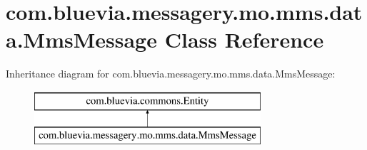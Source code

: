 \hypertarget{classcom_1_1bluevia_1_1messagery_1_1mo_1_1mms_1_1data_1_1MmsMessage}{
\section{com.bluevia.messagery.mo.mms.data.MmsMessage Class Reference}
\label{classcom_1_1bluevia_1_1messagery_1_1mo_1_1mms_1_1data_1_1MmsMessage}
}
Inheritance diagram for com.bluevia.messagery.mo.mms.data.MmsMessage:\begin{figure}[H]
\begin{center}
\leavevmode
\includegraphics[height=2.000000cm]{classcom_1_1bluevia_1_1messagery_1_1mo_1_1mms_1_1data_1_1MmsMessage}
\end{center}
\end{figure}
